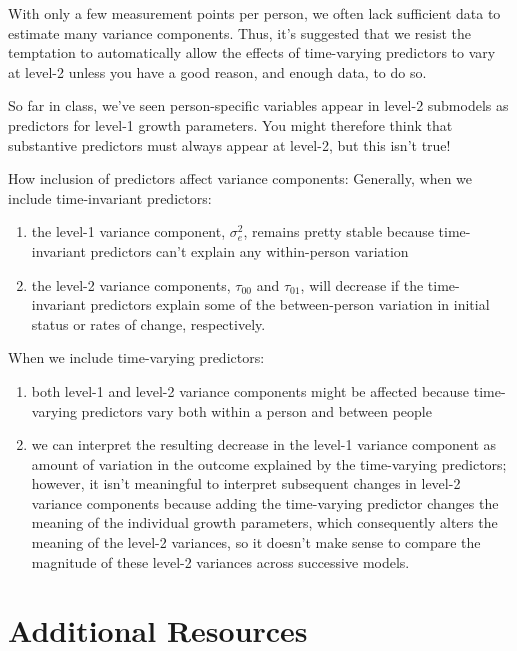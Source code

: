 \documentclass[
  letterpaper,
  DIV=11,
  numbers=noendperiod]{scrreprt}
\begin{document}
With only a few measurement points per person, we often lack sufficient
data to estimate many variance components. Thus, it's suggested that we
resist the temptation to automatically allow the effects of time-varying
predictors to vary at level-2 unless you have a good reason, and enough
data, to do so.

So far in class, we've seen person-specific variables appear in level-2
submodels as predictors for level-1 growth parameters. You might
therefore think that substantive predictors must always appear at
level-2, but this isn't true!

How inclusion of predictors affect variance components: Generally, when
we include time-invariant predictors:

\begin{enumerate}
\def\labelenumi{\arabic{enumi}.}
\item
  the level-1 variance component, \(\sigma^2_e\), remains pretty stable
  because time-invariant predictors can't explain any within-person
  variation
\item
  the level-2 variance components, \(\tau_{00}\) and \(\tau_{01}\), will
  decrease if the time-invariant predictors explain some of the
  between-person variation in initial status or rates of change,
  respectively.
\end{enumerate}

When we include time-varying predictors:

\begin{enumerate}
\def\labelenumi{\arabic{enumi}.}
\item
  both level-1 and level-2 variance components might be affected because
  time-varying predictors vary both within a person and between people
\item
  we can interpret the resulting decrease in the level-1 variance
  component as amount of variation in the outcome explained by the
  time-varying predictors; however, it isn't meaningful to interpret
  subsequent changes in level-2 variance components because adding the
  time-varying predictor changes the meaning of the individual growth
  parameters, which consequently alters the meaning of the level-2
  variances, so it doesn't make sense to compare the magnitude of these
  level-2 variances across successive models.
\end{enumerate}

\hypertarget{additional-resources-1}{%
\section{Additional Resources}\label{additional-resources-1}}
\end{document}
